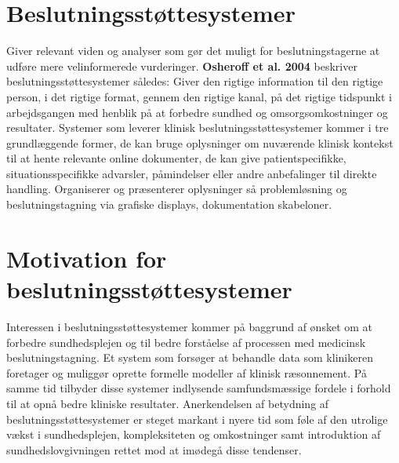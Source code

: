 \section{Beslutningsstøttesystemer}
Giver relevant viden og analyser som gør det muligt for beslutningstagerne at udføre mere velinformerede vurderinger. \textbf{Osheroff et al. 2004} beskriver beslutningsstøttesystemer således: Giver den rigtige information til den rigtige person, i det rigtige format, gennem den rigtige kanal, på det rigtige tidspunkt i arbejdsgangen med henblik på at forbedre sundhed og omsorgsomkostninger og resultater. Systemer som leverer klinisk beslutningsstøttesystemer kommer i tre grundlæggende former, de kan bruge oplysninger om nuværende klinisk kontekst til at hente relevante online dokumenter, de kan give patientspecifikke, situationsspecifikke advarsler, påmindelser eller andre anbefalinger til direkte handling. Organiserer og præsenterer oplysninger så problemløsning og beslutningstagning via grafiske displays, dokumentation skabeloner. \citep{Masys2006a}

\section{Motivation for beslutningsstøttesystemer}
Interessen i beslutningsstøttesystemer kommer på baggrund af ønsket om at forbedre sundhedsplejen og til bedre forståelse af processen med medicinsk beslutningstagning. Et system som forsøger at behandle data som klinikeren foretager og muliggør oprette formelle modeller af klinisk ræsonnement. På samme tid tilbyder disse systemer indlysende samfundsmæssige fordele i forhold til at opnå bedre kliniske resultater. Anerkendelsen af betydning af beslutningsstøttesystemer er steget markant i nyere tid som føle af den utrolige vækst i sundhedsplejen, kompleksiteten og omkostninger samt introduktion af sundhedslovgivningen rettet mod at imødegå disse tendenser. \citep{Masys2006a}

